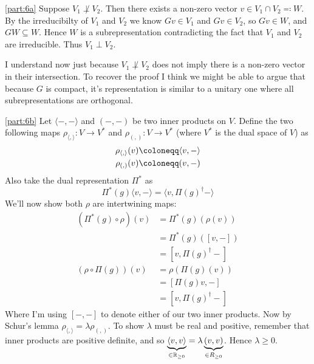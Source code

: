 \documentclass[
	pages,
	boxes,
	color=WildStrawberry
]{homework}
\begin{document}
\begin{solution}
	\ref{part:6a}
	Suppose $V_1\not\perp V_2$. Then there exists a non-zero vector $v\in V_1\cap V_2 \eqqcolon W$. By the irreducibilty of $V_1$ and $V_2$ we know $Gv\in V_1$ and $Gv\in V_2$, so $Gv\in W$, and $GW\subseteq W$. Hence $W$ is a subrepresentation contradicting the fact that $V_1$ and $V_2$ are irreducible. Thus $V_1\perp V_2$.

	I understand now just because $V_1\not\perp V_2$ does not imply there is a non-zero vector in their intersection. To recover the proof I think we might be able to argue that because $G$ is compact, it's representation is similar to a unitary one where all subrepresentations are orthogonal.

	\ref{part:6b}
	Let $\langle-,-\rangle$ and $(-, -)$ be two inner products on $V$. Define the two following maps $\rho_{\langle,\rangle}: V \to V^*$ and $\rho_{(,)}: V \to V^*$ (where $V^*$ is the dual space of $V$) as
	\begin{align*}
		\rho_{\langle,\rangle}(v) & \defeq \langle v, -\rangle \\
		\rho_{(,)}(v)             & \defeq (v, -)
	\end{align*}
	Also take the dual representation $\Pi^*$ as
	\begin{equation*}
		\Pi^*(g)\langle v, -\rangle = \langle v, \Pi(g)^\dagger-\rangle
	\end{equation*}
	We'll now show both $\rho$ are intertwining maps:
	\begin{align*}
		(\Pi^*(g) \circ \rho)(v) & = \Pi^*(g)(\rho(v))    \\
		                         & = \Pi^*(g)([v, -])     \\
		                         & = [v, \Pi(g)^\dagger-] \\
		(\rho\circ \Pi(g))(v)    & = \rho(\Pi(g)(v))      \\
		                         & = [\Pi(g)v,-]          \\
		                         & = [v, \Pi(g)^\dagger-]
	\end{align*}
	Where I'm using $[-,-]$ to denote either of our two inner products. Now by Schur's lemma $\rho_{\langle,\rangle} = \lambda\rho_{(,)}$. To show $\lambda$ must be real and positive, remember that inner products are positive definite, and so $\underbrace{\langle v, v\rangle}_{\in \mathbb{R}_{\geq 0}} = \lambda\underbrace{(v, v)}_{\in R_{\geq 0}}$. Hence $\lambda \geq 0$.
\end{solution}
\end{document}
